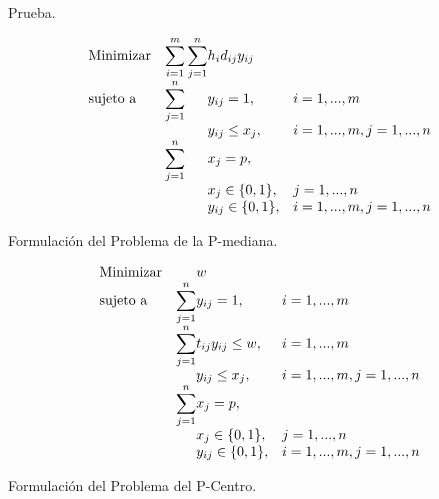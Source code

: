 \documentclass[spanish]{article}
\begin{document}
		\paragraph{}
		Prueba.

		\begin{eqfloat}
			\begin{equation}
				\begin{array}{ll@{}ll}
					\text{Minimizar}
						& \displaystyle\sum\limits_{i = 1}^m
							\displaystyle\sum\limits_{j = 1}^n	& h_i d_{ij} y_{ij}	&							\\
					\text{sujeto a}
						& \displaystyle\sum\limits_{j = 1}^n 	& y_{ij} = 1,		& i = 1,..., m	\\
						& 																	 	& y_{ij} \leq x_{j},  		& i=1 ,..., m,j=1 ,..., n  \\
						& \displaystyle\sum\limits_{j = 1}^n 	& x_{j} = p,  		& 						\\
						&                                     &	x_{j} \in \{0,1\},&j=1 ,..., n 	\\
						&                                     &	y_{ij} \in \{0,1\},&i=1 ,..., m, j=1 ,..., n  \\
				\end{array}
			\end{equation}
			\caption{Formulación del Problema de la P-mediana.}
      \label{eq:p_median}
    \end{eqfloat}

		\begin{eqfloat}
			\begin{equation}
				\begin{array}{ll@{}ll}
					\text{Minimizar}
						& 																 		& w	&							\\
					\text{sujeto a}
						& \displaystyle\sum\limits_{j = 1}^n 	& y_{ij} = 1,		&i=1 ,..., m	\\
						& \displaystyle\sum\limits_{j = 1}^n 	& t_{ij}y_{ij} \leq w,  		& i=1 ,..., m \\
						& 																	 	& y_{ij} \leq x_{j},  		& i=1 ,..., m,j=1 ,..., n  \\
						& \displaystyle\sum\limits_{j = 1}^n 	& x_{j} = p,  		& 						\\
						&                                     &	x_{j} \in \{0,1\},&j=1 ,..., n 	\\
						&                                     &	y_{ij} \in \{0,1\},&i=1 ,..., m, j=1 ,..., n  \\
				\end{array}
			\end{equation}
			\caption{Formulación del Problema del P-Centro.}
      \label{eq:p_center}
    \end{eqfloat}

	\nocite{subject:mio}
	
  
\end{document}
